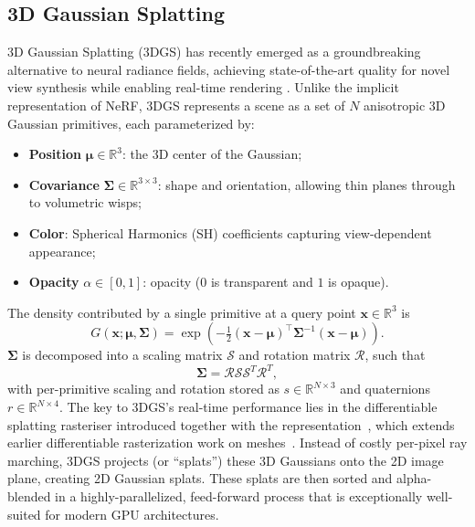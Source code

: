 \subsection{3D Gaussian Splatting}
\label{sec:rep_3d_gaussian}

3D Gaussian Splatting (3DGS) has recently emerged as a groundbreaking alternative to neural radiance fields, achieving state-of-the-art quality for novel view synthesis while enabling real-time rendering \cite{kerbl20233d}.
Unlike the implicit representation of NeRF, 3DGS represents a scene as a set of $N$ anisotropic 3D Gaussian primitives, each parameterized by:
\begin{itemize}[leftmargin=2em,itemsep=0.35em]
    \item \textbf{Position} $\boldsymbol{\mu} \in \mathbb{R}^3$: the 3D center of the Gaussian;
    \item \textbf{Covariance} $\boldsymbol{\Sigma} \in \mathbb{R}^{3\times 3}$: shape and orientation, allowing thin planes through to volumetric wisps;
    \item \textbf{Color}: Spherical Harmonics (SH) coefficients capturing view-dependent appearance;
    \item \textbf{Opacity} $\alpha \in [0,1]$: opacity ($0$ is transparent and $1$ is opaque).
\end{itemize}
The density contributed by a single primitive at a query point $\mathbf{x} \in \mathbb{R}^3$ is
\begin{equation}
G(\mathbf{x}; \boldsymbol{\mu}, \boldsymbol{\Sigma}) = \exp\!\left(-\tfrac{1}{2} (\mathbf{x}-\boldsymbol{\mu})^{\top} \boldsymbol{\Sigma}^{-1} (\mathbf{x}-\boldsymbol{\mu}) \right).
\end{equation}
$\boldsymbol{\Sigma}$ is decomposed into a scaling matrix $\mathcal{S}$ and rotation matrix $\mathcal{R}$, such that
\begin{equation}
\boldsymbol{\Sigma} = \mathcal{R}\mathcal{S}\mathcal{S}^T\mathcal{R}^T,
\end{equation}
with per-primitive scaling and rotation stored as $s \in \mathbb{R}^{N \times 3}$ and quaternions $r \in \mathbb{R}^{N \times 4}$. The key to 3DGS's real-time performance lies in the differentiable splatting rasteriser introduced together with the representation~\cite{kerbl20233d}, which extends earlier differentiable rasterization work on meshes~\cite{liu2019soft}.
Instead of costly per-pixel ray marching, 3DGS projects (or ``splats'') these 3D Gaussians onto the 2D image plane, creating 2D Gaussian splats.
These splats are then sorted and alpha-blended in a highly-parallelized, feed-forward process that is exceptionally well-suited for modern GPU architectures.
